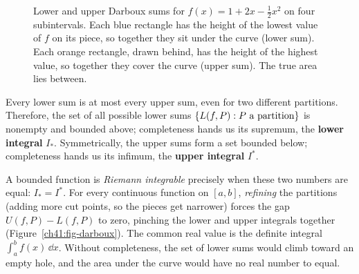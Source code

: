 \begin{figure}[H]
\centering
{}
\caption{Lower and upper Darboux sums for $f(x)=1+2x-\tfrac12x^2$ on four subintervals. Each
blue rectangle has the height of the lowest value of $f$ on its piece, so together they sit
under the curve (lower sum). Each orange rectangle, drawn behind, has the height of the
highest value, so together they cover the curve (upper sum). The true area lies between.}
\label{ch41:fig-darboux-rects}
\end{figure}

Every lower sum is at most every upper sum, even for two different partitions. Therefore, the set of all possible lower sums
$\{L(f,P) : P \text{ a partition}\}$ is nonempty and bounded above; completeness hands us its
supremum, the \textbf{lower integral} $I_*$. Symmetrically, the upper sums form a set bounded below;
completeness hands us its infimum, the \textbf{upper integral} $I^*$.

A bounded function is \emph{Riemann integrable} precisely when these two numbers are equal: $I_* = I^*$.
For every continuous function on $[a,b]$, \emph{refining} the partitions (adding more cut
points, so the pieces get narrower) forces the gap $U(f,P) - L(f,P)$
to zero, pinching the lower and upper integrals together (Figure~\ref{ch41:fig-darboux}).
The common real value is the definite integral $\int_a^b f(x)\,\dd x$.
Without completeness, the set of lower sums would climb toward an empty hole, and the area under
the curve would have no real number to equal.

